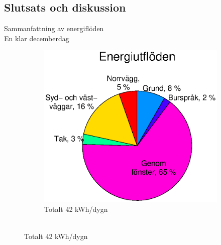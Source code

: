 \subsection{Slutsats och diskussion}

\begin{frame}{Sammanfattning av energiflöden\\En klar decemberdag}


\begin{figure}
        \begin{subfigure}[b]{0.55\textwidth}
                \centering
                \includegraphics[width=\textwidth]{images/totalflow_out.eps}
                \caption*{Totalt 42 kWh/dygn \\ ~}
        \end{subfigure}
        \hskip-1.5cm
\end{figure}
\end{frame}
